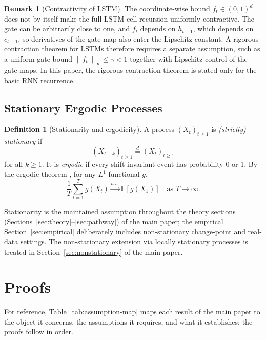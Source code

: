 \documentclass[bj,authoryear]{imsart}
\theoremstyle{plain}
\theoremstyle{definition}
\newtheorem{definition}{Definition}[section]
\newtheorem{remark}{Remark}[section]
\newcommand{\E}{\mathbb{E}}
\newcommand{\norm}[1]{\left\lVert #1 \right\rVert}
\begin{document}
\begin{remark}[Contractivity of LSTM]
  The coordinate-wise bound $f_t\in(0,1)^d$ does not by itself make the full
  LSTM cell recursion uniformly contractive.  The gate can be arbitrarily close
  to one, and $f_t$ depends on $h_{t-1}$, which depends on $c_{t-1}$, so
  derivatives of the gate map also enter the Lipschitz constant.  A rigorous
  contraction theorem for LSTMs therefore requires a separate assumption, such
  as a uniform gate bound $\norm{f_t}_\infty\leq\gamma<1$ together with Lipschitz
  control of the gate maps.  In this paper, the rigorous contraction theorem is
  stated only for the basic RNN recurrence.
\end{remark}

\subsection{Stationary Ergodic Processes}

\begin{definition}[Stationarity and ergodicity]
\label{def:ergodic}
  A process $(X_t)_{t\geq 1}$ is \emph{(strictly) stationary} if
  $$(X_{t+k})_{t\geq 1} \overset{d}{=} (X_t)_{t\geq 1}$$ for all $k \geq 1$.
  It is \emph{ergodic} if every shift-invariant event has probability 0 or 1.
  By the ergodic theorem \citep{walters2000introduction}, for any $L^1$
  functional $g$,
  \[
    \frac{1}{T}\sum_{t=1}^T g(X_t) \xrightarrow{a.s.} \E[g(X_1)]
    \quad \text{as } T\to\infty.
  \]
\end{definition}

Stationarity is the maintained assumption throughout the theory sections
(Sections~\ref{sec:theory}--\ref{sec:pathway}) of the main paper;
the empirical Section~\ref{sec:empirical} deliberately includes non-stationary
change-point and real-data settings.  The non-stationary extension via locally
stationary processes \citep{dahlhaus1997fitting} is treated in
Section~\ref{sec:nonstationary} of the main paper.

\section{Proofs}
\label{app:proofs}

For reference, Table~\ref{tab:assumption-map} maps each result of the main
paper to the object it concerns, the assumptions it requires, and what it
establishes; the proofs follow in order.
\end{document}
